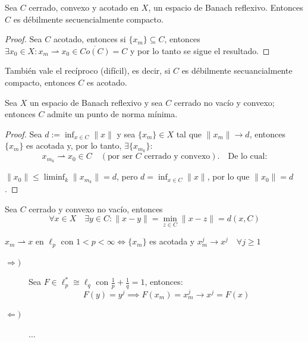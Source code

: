 \begin{coro}
    Sea $C$ cerrado, convexo y acotado en $X$, un espacio de Banach reflexivo. Entonces $C$ es débilmente secuencialmente compacto.
\begin{proof}
    Sea $C$ acotado, entonces si $\{x_m\} \subseteq C$, entonces $\exists x_0 \in X : x_m \rightharpoonup x_0 \in \overline{Co(C)} = C$ y por lo tanto se sigue el resultado.
\end{proof}
\end{coro}

\begin{observacion}
    También vale el recíproco (difícil), es decir, si $C$ es débilmente secuancialmente compacto, entonces $C$ es acotado.
\end{observacion}

\begin{coro}
    Sea $X$ un espacio de Banach reflexivo y sea $C$ cerrado no vacío y convexo; entonces $C$ admite un punto de norma mínima.
\begin{proof}
    Sea $d := \inf_{x \in C} \|x\|$ y sea $\{x_m\} \in X$ tal que $\|x_m\| \longrightarrow d$, entonces $\{x_m\}$ es acotada y, por lo tanto, $\exists \{x_{m_k}\} :$
    \[ x_{m_k} \rightharpoonup x_0 \in C \quad (\text{por ser } C \text{ cerrado y convexo}). \quad \text{De lo cual:} \]

    $\|x_0\| \le \liminf_k \|x_{m_k}\| = d$, pero $d = \inf_{x \in C} \|x\|$, por lo que $\|x_0\| = d$.
\end{proof}
\end{coro}

\begin{coro}
    Sea $C$ cerrado y convexo no vacío, entonces 
    $$\forall x \in X \quad \exists y \in C : \|x - y\| = \min_{z \in C} \|x - z\| = d(x, C)$$
\end{coro}

\begin{ejemplo}
    $x_m \rightharpoonup x$ en $\ell_p$ con $1<p<\infty \iff \{x_m\}$ es acotada y $x_m^j \longrightarrow x^j \quad \forall j \ge 1$ \\
    \begin{description}
        \item[$\Longrightarrow)$] Sea $F \in \ell_p^* \cong \ell_q$ con $\frac{1}{p} + \frac{1}{q} = 1$, entonces:
        $$F(y) = y^j \implies F(x_m) = x_m^j \longrightarrow x^j = F(x)$$
        \item[$\Longleftarrow)$] $\dots$
    \end{description}
\end{ejemplo}

